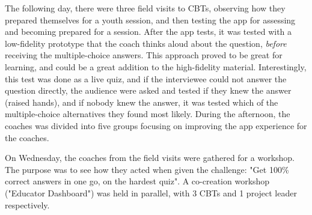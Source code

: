 The following day, there were three field visits to CBTs, observing how they prepared themselves for a youth session, and then testing the app for assessing and becoming prepared for a session. After the app tests, it was tested with a low-fidelity prototype that the coach thinks aloud about the question, \textit{before} receiving the multiple-choice answers. This approach proved to be great for learning, and could be a great addition to the high-fidelity material. Interestingly, this test was done as a live quiz, and if the interviewee could not answer the question directly, the audience were asked and tested if they knew the answer (raised hands), and if nobody knew the answer, it was tested which of the multiple-choice alternatives they found most likely. During the afternoon, the coaches was divided into five groups focusing on improving the app experience for the coaches.

On Wednesday, the coaches from the field visits were gathered for a workshop. The purpose was to see how they acted when given the challenge: "Get 100\% correct answers in one go, on the hardest quiz". A co-creation workshop ("Educator Dashboard") was held in parallel, with 3 CBTs and 1 project leader respectively.
